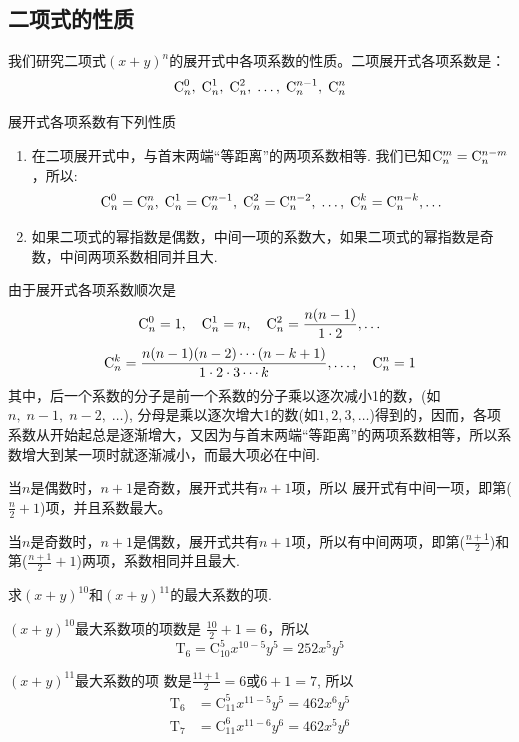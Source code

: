 \subsection{二项式的性质}

我们研究二项式$(x+y)^n$的展开式中各项系数的性质。二项展开式各项系数是：
\[{\rm C}^{0}_{n},\;{\rm C}^{1}_{n},\;{\rm C}^{2}_{n},\;\ldots,\; {\rm C}^{n-1}_{n},\;{\rm C}^{n}_{n}\]

展开式各项系数有下列性质
\begin{enumerate}
\item 在二项展开式中，与首末两端“等距离”的两项系数相等. 我们已知${\rm C}^{m}_{n}={\rm C}^{n-m}_{n}$，所以:
\[{\rm C}^{0}_{n}={\rm C}^{n}_{n},\; {\rm C}^{1}_{n}={\rm C}^{n-1}_{n},\; {\rm C}^{2}_{n}={\rm C}^{n-2}_{n},\; \ldots,\; {\rm C}^{k}_{n}={\rm C}^{n-k}_{n},\ldots\]
\item 如果二项式的幂指数是偶数，中间一项的系数大，如果二项式的幂指数是奇数，中间两项系数相同并且大.
\end{enumerate}

由于展开式各项系数顺次是
\[{\rm C}^{0}_{n}=1,\quad {\rm C}^{1}_{n}=n,\quad {\rm C}^{2}_{n}=\dfrac{n(n-1)}{1\cdot 2},\ldots\]
\[{\rm C}^{k}_{n}=\dfrac{n(n-1)(n-2)\cdots(n-k+1)}{1\cdot 2\cdot 3\cdots k},\ldots,\quad {\rm C}^{n}_{n}=1\]
其中，后一个系数的分子是前一个系数的分子乘以逐次减小1的数，(如$n,\; n-1,\; n-2,\; \ldots$), 分母是乘以逐次增大1的数(如$1,2,3,\ldots$)得到的，因而，各项系数从开始起总是逐渐增大，又因为与首末两端“等距离”的两项系数相等，所以系数增大到某一项时就逐渐减小，而最大项必在中间.

当$n$是偶数时，$n+1$是奇数，展开式共有$n+1$项，所以
展开式有中间一项，即第($\frac{n}{2}+1$)项，并且系数最大。

当$n$是奇数时，$n+1$是偶数，展开式共有$n+1$项，所以有中间两项，即第($\frac{n+1}2$)和第($\frac{n+1}2+1$)两项，系数相同并且最大.

\begin{example}
    求$(x+y)^{10}$和$(x+y)^{11}$的最大系数的项.
\end{example}

\begin{solution}
    $(x+y)^{10}$最大系数项的项数是
$\frac{10}{2}+1=6$，所以
$$\mathrm{T}_{6}=\mathrm{C}_{10}^{5} x^{10-5}y^{5}=252x^{5}y^{5}$$

$(x+y)^{11}$最大系数的项 数是$\frac{11+1}{2}=6$或$6+1=7$, 所以
\[\begin{split}
    \mathrm{T}_{6}&=\mathrm{C}_{11}^{5}x^{11-5}y^{5}=462x^{6}y^{5}\\
    \mathrm{T}_{7}&=\mathrm{C}_{11}^{6}x^{11-6}y^{6}=462x^{5}y^{6}
\end{split}\]
\end{solution}

